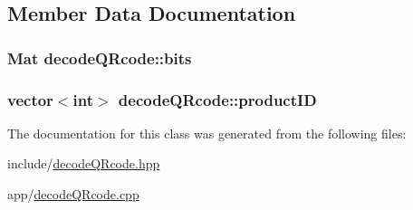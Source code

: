 \subsection{Member Data Documentation}
\subsubsection[{\texorpdfstring{bits}{bits}}]{\setlength{\rightskip}{0pt plus 5cm}Mat decode\+Q\+Rcode\+::bits}\hypertarget{classdecodeQRcode_a5041ce83542f15b8ccd67203e9426fe4}{}\label{classdecodeQRcode_a5041ce83542f15b8ccd67203e9426fe4}
\subsubsection[{\texorpdfstring{product\+ID}{productID}}]{\setlength{\rightskip}{0pt plus 5cm}vector$<$int$>$ decode\+Q\+Rcode\+::product\+ID}\hypertarget{classdecodeQRcode_aec2882b61f6f3694856894a36248a66d}{}\label{classdecodeQRcode_aec2882b61f6f3694856894a36248a66d}


The documentation for this class was generated from the following files\+:\begin{DoxyCompactItemize}
\item 
include/\hyperlink{decodeQRcode_8hpp}{decode\+Q\+Rcode.\+hpp}\item 
app/\hyperlink{decodeQRcode_8cpp}{decode\+Q\+Rcode.\+cpp}\end{DoxyCompactItemize}
